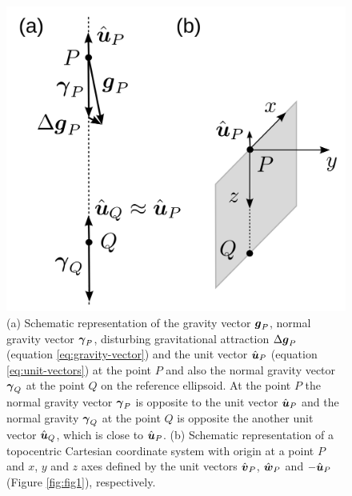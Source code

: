 \documentclass[extra]{gji}
\begin{document}
\begin{figure}
    \includegraphics{figures/local-system.png}
    \caption{(a) Schematic representation of the gravity vector
    $\mitbf{g}_{P}$, normal gravity vector $\mitbf{\gamma}_{P}$,
    disturbing gravitational attraction $\Delta \mitbf{g}_{P}$
    (equation \ref{eq:gravity-vector}) and the unit vector 
    $\hat{\mitbf{u}}_{P}$ (equation \ref{eq:unit-vectors}) 
    at the point $P$ and also the normal gravity vector
    $\mitbf{\gamma}_{Q}$ at the point $Q$ on the reference ellipsoid.
    At the point $P$ the normal gravity vector $\mitbf{\gamma}_{P}$ 
    is opposite to the unit vector $\hat{\mitbf{u}}_{P}$ and the 
    normal gravity $\mitbf{\gamma}_{Q}$ at the point $Q$ is opposite
    the another unit vector $\hat{\mitbf{u}}_{Q}$, which is
    close to $\hat{\mitbf{u}}_{P}$.
    (b) Schematic representation of a topocentric Cartesian 
    coordinate system with origin at a point $P$ and $x$, $y$ and $z$ 
    axes defined by the unit vectors $\hat{\mitbf{v}}_{P}$, 
    $\hat{\mitbf{w}}_{P}$ and $-\hat{\mitbf{u}}_{P}$ 
    (Figure \ref{fig:fig1}), respectively.}
  \label{fig:fig2}
\end{figure}

\label{lastpage}
\end{document}

